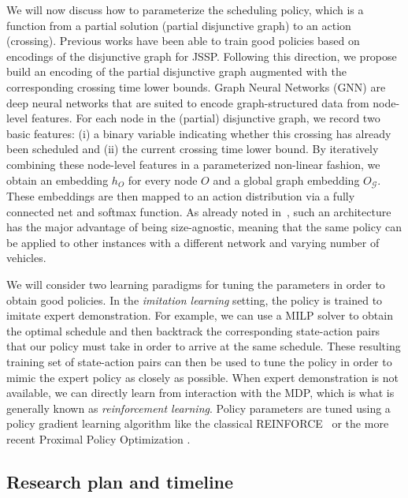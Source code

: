 \documentclass[notitlepage]{report}
\begin{document}
We will now discuss how to parameterize the scheduling policy, which is a
function from a partial solution (partial disjunctive graph) to an action
(crossing).
Previous works have been able to train good policies based on encodings of the
disjunctive graph for JSSP. Following this direction, we propose build
an encoding of the partial disjunctive graph augmented with the corresponding
crossing time lower bounds.
%
Graph Neural Networks (GNN) are deep neural networks that are suited to encode
graph-structured data from node-level features. For each node in the (partial)
disjunctive graph, we record two basic features: (i) a binary variable
indicating whether this crossing has already been scheduled and (ii) the current
crossing time lower bound. By iteratively combining these node-level features in
a parameterized non-linear fashion, we obtain an embedding $h_{O}$ for every
node $O$ and a global graph embedding $O_{\mathcal{G}}$. These embeddings are
then mapped to an action distribution via a fully connected net and softmax
function.
As already noted in~\cite{zhangLearningDispatchJob2020}, such an architecture has the major advantage of being
size-agnostic, meaning that the same policy can be applied to other instances
with a different network and varying number of vehicles.

We will consider two learning paradigms for tuning the parameters in order to
obtain good policies. In the \textit{imitation learning} setting, the policy is
trained to imitate expert demonstration. For example, we can use a MILP solver
to obtain the optimal schedule and then backtrack the corresponding state-action
pairs that our policy must take in order to arrive at the same schedule. These
resulting training set of state-action pairs can then be used to tune the policy
in order to mimic the expert policy as closely as possible.
When expert demonstration is not available, we can directly learn from
interaction with the MDP, which is what is generally known as \textit{reinforcement
  learning}. Policy parameters are tuned using a policy gradient
learning algorithm like the classical REINFORCE~\cite{10.1007/BF00992696} or the
more recent Proximal Policy Optimization
\cite{schulmanProximalPolicyOptimization2017}.


\subsection*{Research plan and timeline}
\end{document}
